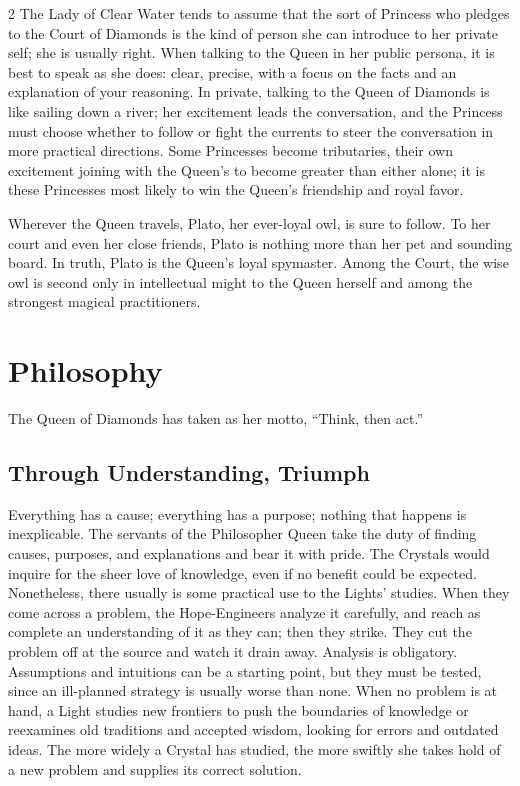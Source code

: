 \begin{multicols}{2}
The Lady of Clear Water tends to assume that the sort of Princess who pledges to the Court of Diamonds is the kind of person she can introduce to her private self; she is usually right. When talking to the Queen in her public persona, it is best to speak as she does: clear, precise, with a focus on the facts and an explanation of your reasoning. In private, talking to the Queen of Diamonds is like sailing down a river; her excitement leads the conversation, and the Princess must choose whether to follow or fight the currents to steer the conversation in more practical directions. Some Princesses become tributaries, their own excitement joining with the Queen's to become greater than either alone; it is these Princesses most likely to win the Queen's friendship and royal favor.

Wherever the Queen travels, Plato, her ever-loyal owl, is sure to follow. To her court and even her close friends, Plato is nothing more than her pet and sounding board. In truth, Plato is the Queen's loyal spymaster. Among the Court, the wise owl is second only in intellectual might to the Queen herself and among the strongest magical practitioners.

\section*{Philosophy}

The Queen of Diamonds has taken as her motto, \textquotedblleft Think, then act.\textquotedblright

\subsection*{Through Understanding, Triumph}
Everything has a cause; everything has a purpose; nothing that happens is inexplicable. The servants of the Philosopher Queen take the duty of finding causes, purposes, and explanations and bear it with pride. The Crystals would inquire for the sheer love of knowledge, even if no benefit could be expected. Nonetheless, there usually is some practical use to the Lights' studies. When they come across a problem, the Hope-Engineers analyze it carefully, and reach as complete an understanding of it as they can; then they strike. They cut the problem off at the source and watch it drain away. Analysis is obligatory. Assumptions and intuitions can be a starting point, but they must be tested, since an ill-planned strategy is usually worse than none. When no problem is at hand, a Light studies new frontiers to push the boundaries of knowledge or reexamines old traditions and accepted wisdom, looking for errors and outdated ideas. The more widely a Crystal has studied, the more swiftly she takes hold of a new problem and supplies its correct solution.


\end{multicols}

